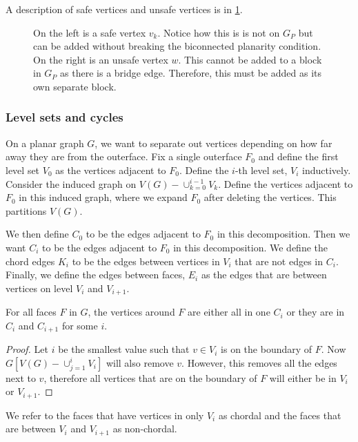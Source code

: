 A description of safe vertices and unsafe vertices is in \cref{fig:safe_vertices}.

\begin{figure}[h!]
	\centering
	
	\caption[Safe and unsafe vertices]{On the left is a safe vertex $v_k$. Notice how this is is not on $G_P$ but can be added without breaking the biconnected planarity condition. On the right is an unsafe vertex $w$. This cannot be added to a block in $G_P$ as there is a bridge edge. Therefore, this must be added as its own separate block.}
	\label{fig:safe_vertices}
\end{figure}

\subsubsection{Level sets and cycles}
On a planar graph \(G\), we want to separate out vertices depending on how far away they are from the outerface. Fix a single outerface \(F_0\) and define the first level set \(V_0\) as the vertices adjacent to \(F_0\). Define the \(i\)-th level set, \(V_i\) inductively. Consider the induced graph on \(V(G) - \cup_{k = 0}^{i-1} V_k\). Define the vertices adjacent to \(F_0\) in this induced graph, where we expand \(F_0\) after deleting the vertices. This partitions \(V(G)\).

We then define \(C_0\) to be the edges adjacent to \(F_0\) in this decomposition. Then we want \(C_i\) to be the edges adjacent to \(F_0\) in this decomposition. We define the chord edges \(K_i\) to be the edges between vertices in \(V_i\) that are not edges in \(C_i\). Finally, we define the edges between faces, \(E_i\) as the edges that are between vertices on level \(V_i\) and \(V_{i + 1}\).

\begin{claim}
	For all faces \(F\) in \(G\), the vertices around \(F\) are either all in one \(C_i\) or they are in \(C_i\) and \(C_{i + 1}\) for some \(i\).
\end{claim}

\begin{proof}
	Let \(i\) be the smallest value such that \(v \in V_i\) is on the boundary of \(F\). Now \(G[V(G) - \cup_{j = 1}^{i} V_i]\) will also remove \(v\). However, this removes all the edges next to \(v\), therefore all vertices that are on the boundary of \(F\) will either be in \(V_i\) or \(V_{i + 1}\).
\end{proof}
We refer to the faces that have vertices in only \(V_i\) as chordal and the faces that are between \(V_i\) and \(V_{i + 1}\) as non-chordal.

